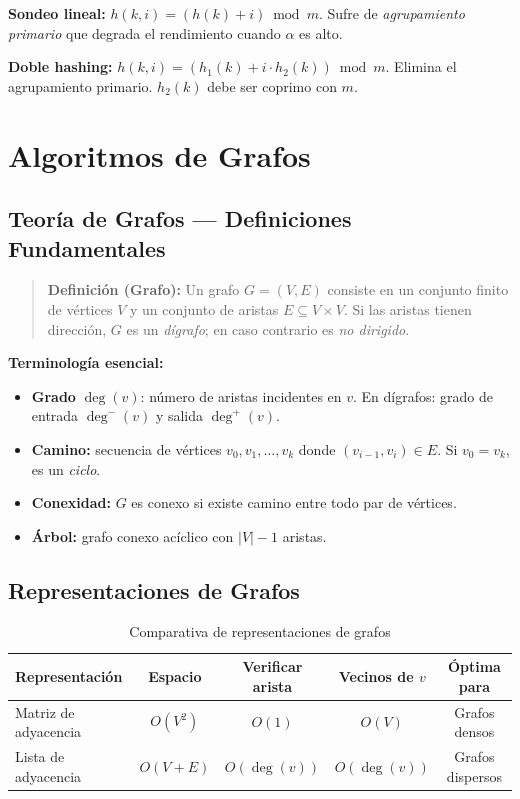 \documentclass[12pt, letterpaper]{article}
\begin{document}
	\textbf{Sondeo lineal:} $h(k, i) = (h(k) + i) \bmod m$. Sufre de \textit{agrupamiento primario} que degrada el rendimiento cuando $\alpha$ es alto.
	
	\textbf{Doble hashing:} $h(k,i) = (h_1(k) + i \cdot h_2(k)) \bmod m$. Elimina el agrupamiento primario. $h_2(k)$ debe ser coprimo con $m$.
	
	\section{Algoritmos de Grafos}
	
	\subsection{Teoría de Grafos — Definiciones Fundamentales}
	
	\begin{quote}
		\textbf{Definición (Grafo):}
		Un grafo $G = (V, E)$ consiste en un conjunto finito de vértices $V$ y un conjunto de aristas $E \subseteq V \times V$. Si las aristas tienen dirección, $G$ es un \textit{dígrafo}; en caso contrario es \textit{no dirigido}.
	\end{quote}
	
	\textbf{Terminología esencial:}
	\begin{itemize}[noitemsep]
		\item \textbf{Grado} $\deg(v)$: número de aristas incidentes en $v$. En dígrafos: grado de entrada $\deg^-(v)$ y salida $\deg^+(v)$.
		\item \textbf{Camino:} secuencia de vértices $v_0, v_1, \ldots, v_k$ donde $(v_{i-1}, v_i) \in E$. Si $v_0 = v_k$, es un \textit{ciclo}.
		\item \textbf{Conexidad:} $G$ es conexo si existe camino entre todo par de vértices.
		\item \textbf{Árbol:} grafo conexo acíclico con $|V|-1$ aristas.
	\end{itemize}
	
	\subsection{Representaciones de Grafos}
	
	\begin{table}[h!]
		\centering
		\begin{tabular}{lcccc}
			\toprule
			\textbf{Representación} & \textbf{Espacio} & \textbf{Verificar arista} & \textbf{Vecinos de $v$} & \textbf{Óptima para} \\
			\midrule
			Matriz de adyacencia & $O(V^2)$   & $O(1)$          & $O(V)$         & Grafos densos \\
			Lista de adyacencia  & $O(V + E)$ & $O(\deg(v))$    & $O(\deg(v))$   & Grafos dispersos \\
			\bottomrule
		\end{tabular}
		\caption{Comparativa de representaciones de grafos}
	\end{table}
	
\end{document}
